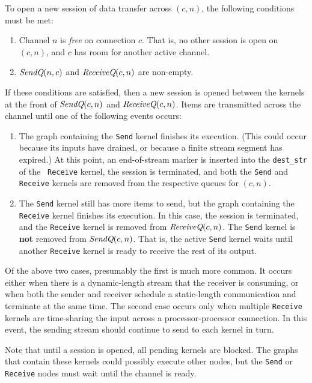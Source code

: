 To open a new session of data transfer across $(c, n)$, the following
conditions must be met:
\begin{enumerate}

\item Channel $n$ is {\it free} on connection $c$.  That is, no other
session is open on $(c, n)$, and $c$ has room for another active
channel.

\item $\mbox{\it SendQ}(n,c)$ and $\mbox{\it ReceiveQ}(c, n)$ are non-empty.

\end{enumerate}
If these conditions are satisfied, then a new session is opened
between the kernels at the front of $\mbox{\it SendQ}(c, n)$ and
$\mbox{\it ReceiveQ}(c, n)$.  Items are transmitted across the channel until
one of the following events occurs:
\begin{enumerate}

\item The graph containing the {\tt Send} kernel finishes its
execution. (This could occur because its inputs have drained, or
because a finite stream segment has expired.)  At this point, an
end-of-stream marker is inserted into the {\tt dest\_str} of the {\tt
Receive} kernel, the session is terminated, and both the {\tt Send}
and {\tt Receive} kernels are removed from the respective queues for
$(c, n)$.

\item The {\tt Send} kernel still has more items to send, but the
graph containing the {\tt Receive} kernel finishes its execution.  In
this case, the session is terminated, and the {\tt Receive} kernel is
removed from $\mbox{\it ReceiveQ}(c, n)$.  The {\tt Send} kernel is {\bf
not} removed from $\mbox{\it SendQ}(c, n)$.  That is, the active {\tt Send}
kernel waits until another {\tt Receive} kernel is ready to receive
the rest of its output.

\end{enumerate}
Of the above two cases, presumably the first is much more common.  It
occurs either when there is a dynamic-length stream that the receiver
is consuming, or when both the sender and receiver schedule a
static-length communication and terminate at the same time.  The
second case occurs only when multiple {\tt Receive} kernels are
time-sharing the input across a processor-processor connection.  In
this event, the sending stream should continue to send to each kernel
in turn.

Note that until a session is opened, all pending kernels are blocked.
The graphs that contain these kernels could possibly execute other
nodes, but the {\tt Send} or {\tt Receive} nodes must wait until the
channel is ready.

